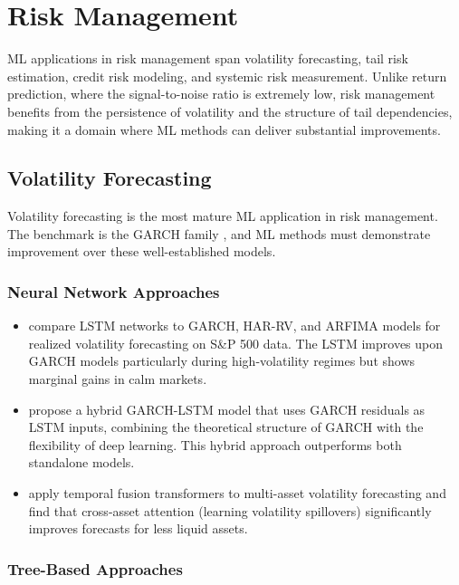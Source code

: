 \section{Risk Management}\label{sec:risk_management}

ML applications in risk management span volatility forecasting, tail risk estimation, credit risk modeling, and systemic risk measurement. Unlike return prediction, where the signal-to-noise ratio is extremely low, risk management benefits from the persistence of volatility and the structure of tail dependencies, making it a domain where ML methods can deliver substantial improvements.

\subsection{Volatility Forecasting}

Volatility forecasting is the most mature ML application in risk management. The benchmark is the GARCH family \citep{Bollerslev1986, Engle2002}, and ML methods must demonstrate improvement over these well-established models.

\subsubsection{Neural Network Approaches}

\begin{itemize}[leftmargin=*]
    \item \citet{Bucci2020} compare LSTM networks to GARCH, HAR-RV, and ARFIMA models for realized volatility forecasting on S\&P 500 data. The LSTM improves upon GARCH models particularly during high-volatility regimes but shows marginal gains in calm markets.

    \item \citet{Zhang2019} propose a hybrid GARCH-LSTM model that uses GARCH residuals as LSTM inputs, combining the theoretical structure of GARCH with the flexibility of deep learning. This hybrid approach outperforms both standalone models.

    \item \citet{Christensen2023} apply temporal fusion transformers to multi-asset volatility forecasting and find that cross-asset attention (learning volatility spillovers) significantly improves forecasts for less liquid assets.
\end{itemize}

\subsubsection{Tree-Based Approaches}

